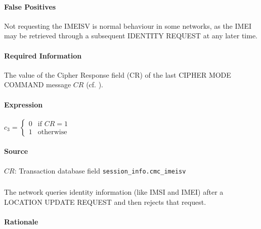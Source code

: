 \documentclass[a4paper,11pt,notitlepage,bigheadings,oneside]{scrartcl}
\begin{document}
\paragraph{False Positives}

Not requesting the IMEISV is normal behaviour in some networks, as the IMEI may
be retrieved through a subsequent IDENTITY REQUEST at any later time.

\paragraph{Required Information}

The value of the Cipher Response field (CR) of the last CIPHER MODE COMMAND
message $CR$ (cf. \cite[10.5.2.10]{gsm0408}).

\paragraph{Expression}

$c_3 =
\begin{cases}
	0       & \text{if } CR = 1 \\
	1	& \text{otherwise}
\end{cases}$



\paragraph{Source}

$CR$: Transaction database field \verb|session_info.cmc_imeisv|

\subsubsection{}

The network queries identity information (like IMSI and IMEI) after a LOCATION
UPDATE REQUEST and then rejects that request.

\paragraph{Rationale}
\end{document}
